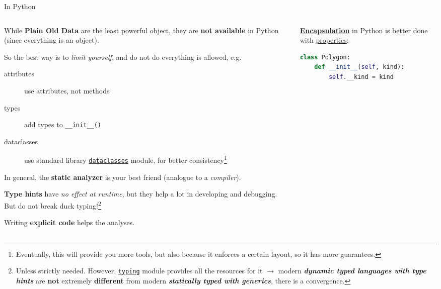 \documentclass[9pt]{beamer}
\begin{document}
\begin{frame}[fragile]{In Python}
    \vspace*{20pt}
    \begin{columns}
        \begin{column}{0.5\textwidth}
            While \textbf{Plain Old Data} are the least powerful object, they
            are \textbf{not available} in Python (since everything is an
            object).
            
            So the best way is to \alert{\textit{limit yourself}}, and do not
            do everything is allowed, e.g.\
            \begin{description}
                \item[attributes] use attributes, not methods
                \item[types] add types to \texttt{\_\_init\_\_()}
                \item[dataclasses] use standard library
                  \href{https://docs.python.org/3/library/dataclasses.html}{\texttt{dataclasses}}
                  module, for better consistency\footnote{
                      Eventually, this will provide you more tools, but also
                      because it enforces a certain layout, so it has more
                      guarantees.
                  }
            \end{description}
            \vspace*{10pt}

            In general, the \textbf{static analyzer} is your best friend
            (analogue to a \textit{compiler}).

            \textbf{Type hints} have \textit{no effect at runtime}, but they
            help a lot in developing and debugging.
            But do not break duck typing!\footnote{
                Unless strictly needed.
                However,
                \href{https://docs.python.org/3/library/typing.html}{\texttt{typing}}
                module provides all the resources for it $\to$ modern
                \textbf{\textit{dynamic typed languages with type hints}} are
                \alert{\textbf{not}} extremely \alert{\textbf{different}} from
                modern \textbf{\textit{statically typed with generics}}, there
                is a convergence.
            }\newline

            Writing \textbf{explicit code} helps the analyses.
        \end{column}
        \begin{column}{0.5\textwidth}
            \href{https://en.wikipedia.org/wiki/Encapsulation_(computer_programming)}{\textbf{Encapsulation}}
            in Python is better done with
            \href{https://docs.python.org/3/library/functions.html#property}{properties}:
            \begin{lstlisting}[language=Python,style=mystyle]
class Polygon:
    def __init__(self, kind):
        self.__kind = kind


\end{lstlisting}
\end{column}
\end{columns}
\end{frame}
\end{document}

